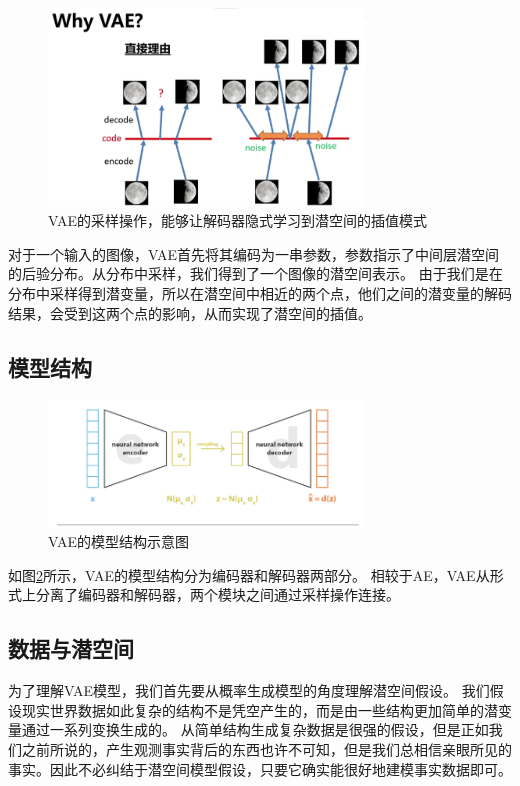 \documentclass[12pt,a4paper]{article}
\begin{document}
\begin{figure}[H]
  \centering
  \includegraphics[width=0.75\textwidth]{../images/whyvae.png}
  \caption{VAE的采样操作，能够让解码器隐式学习到潜空间的插值模式}
  \label{fig:chazhi}
\end{figure}
对于一个输入的图像，VAE首先将其编码为一串参数，参数指示了中间层潜空间的后验分布。从分布中采样，我们得到了一个图像的潜空间表示。
由于我们是在分布中采样得到潜变量，所以在潜空间中相近的两个点，他们之间的潜变量的解码结果，会受到这两个点的影响，从而实现了潜空间的插值。
\subsection{模型结构}
\begin{figure}[H]
  \centering
  \includegraphics[width=0.75\textwidth]{../images/vae.png}
  \caption{VAE的模型结构示意图}
  \label{fig:vae}
\end{figure}
如图\ref{fig:vae}所示，VAE的模型结构分为编码器和解码器两部分。
相较于AE，VAE从形式上分离了编码器和解码器，两个模块之间通过采样操作连接。
\subsection{数据与潜空间}
为了理解VAE模型，我们首先要从概率生成模型的角度理解潜空间假设。
我们假设现实世界数据如此复杂的结构不是凭空产生的，而是由一些结构更加简单的潜变量通过一系列变换生成的。
从简单结构生成复杂数据是很强的假设，但是正如我们之前所说的，产生观测事实背后的东西也许不可知，但是我们总相信亲眼所见的事实。因此不必纠结于潜空间模型假设，只要它确实能很好地建模事实数据即可。
\end{document}

